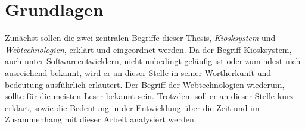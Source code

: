 \chapter{Grundlagen}
\label{chap:grundlagen}

Zunächst sollen die zwei zentralen Begriffe dieser Thesis, \emph{Kiosksystem} und
\emph{Webtechnologien}, erklärt und eingeordnet werden. Da der Begriff
Kiosksystem, auch unter Softwareentwicklern, nicht unbedingt geläufig ist oder
zumindest nich ausreichend bekannt, wird er an dieser Stelle in seiner Wortherkunft
und -bedeutung ausführlich erläutert. Der Begriff der Webtechnologien wiederum, sollte
für die meisten Leser bekannt sein. Trotzdem soll er an dieser Stelle kurz erklärt, sowie
die Bedeutung in der Entwicklung über die Zeit und im Zusammenhang mit dieser Arbeit
analysiert werden.


